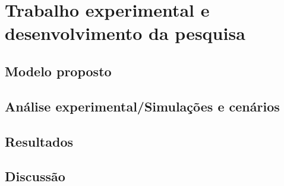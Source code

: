 \chapter{Trabalho experimental e desenvolvimento da pesquisa}
\label{chapter:trabalhoexperimental}



\section{Modelo proposto}
\label{section:titulo41}


\section{An\'alise experimental/Simula\c{c}\~oes e cen\'arios}
\label{section:titulo42}


\section{Resultados}
\label{section:titulo43}


\section{Discuss\~ao}
\label{section:titulo4N}
